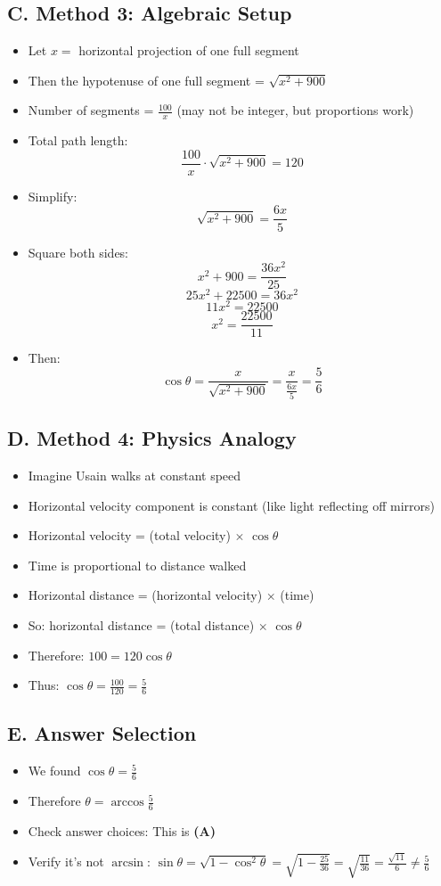 \documentclass[11pt]{article}
\begin{document}
\begin{conversionbox}
\subsection*{C. Method 3: Algebraic Setup}
\begin{itemize}[leftmargin=*]
    \item Let $x = $ horizontal projection of one full segment
    \item Then the hypotenuse of one full segment = $\sqrt{x^2 + 900}$
    \item Number of segments = $\frac{100}{x}$ (may not be integer, but proportions work)
    \item Total path length:
    \[\frac{100}{x} \cdot \sqrt{x^2 + 900} = 120\]
    \item Simplify:
    \[\sqrt{x^2 + 900} = \frac{6x}{5}\]
    \item Square both sides:
    \[x^2 + 900 = \frac{36x^2}{25}\]
    \[25x^2 + 22500 = 36x^2\]
    \[11x^2 = 22500\]
    \[x^2 = \frac{22500}{11}\]
    \item Then:
    \[\cos\theta = \frac{x}{\sqrt{x^2 + 900}} = \frac{x}{\frac{6x}{5}} = \frac{5}{6}\]
\end{itemize}

\subsection*{D. Method 4: Physics Analogy}
\begin{itemize}[leftmargin=*]
    \item Imagine Usain walks at constant speed
    \item Horizontal velocity component is constant (like light reflecting off mirrors)
    \item Horizontal velocity = (total velocity) $\times$ $\cos\theta$
    \item Time is proportional to distance walked
    \item Horizontal distance = (horizontal velocity) $\times$ (time)
    \item So: horizontal distance = (total distance) $\times$ $\cos\theta$
    \item Therefore: $100 = 120 \cos\theta$
    \item Thus: $\cos\theta = \frac{100}{120} = \frac{5}{6}$
\end{itemize}

\subsection*{E. Answer Selection}
\begin{itemize}[leftmargin=*]
    \item We found $\cos\theta = \frac{5}{6}$
    \item Therefore $\theta = \arccos\frac{5}{6}$
    \item Check answer choices: This is \textbf{(A)}
    \item Verify it's not $\arcsin$: $\sin\theta = \sqrt{1 - \cos^2\theta} = \sqrt{1 - \frac{25}{36}} = \sqrt{\frac{11}{36}} = \frac{\sqrt{11}}{6} \neq \frac{5}{6}$
\end{itemize}
\end{conversionbox}
\end{document}
